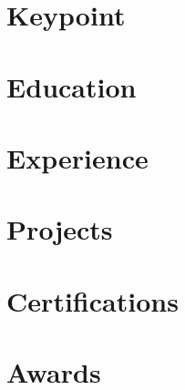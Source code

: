 \documentclass[10pt, letterpaper]{article}
\begin{document}
	
	
	
	
	\section{\faStar \ Keypoint}
	
	
	\section{\faUniversity\ Education}
	
	
	\section{\faBriefcase\ Experience}
	
	
	\section{\faCode\ Projects}
	
	
	\section{\faCertificate\ Certifications}
	
	
	\section{\faTrophy\ Awards}
	
	
\end{document}
